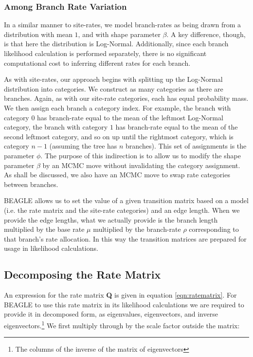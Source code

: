 \documentclass[10pt,journal,compsoc]{IEEEtran}
\begin{document}
\subsubsection{Among Branch Rate Variation}

In a similar manner to site-rates, we model branch-rates as being drawn from a distribution with mean $1$, and with shape parameter $\beta$. A key difference, though, is that here the distribution is Log-Normal. Additionally, since each branch likelihood calculation is performed separately, there is no significant computational cost to inferring different rates for each branch.

As with site-rates, our approach begins with splitting up the Log-Normal distribution into categories. We construct as many categories as there are branches. Again, as with our site-rate categories, each has equal probability mass. We then assign each branch a category index. For example, the branch with category $0$ has branch-rate equal to the mean of the leftmost Log-Normal category, the branch with category $1$ has branch-rate equal to the mean of the second leftmost category, and so on up until the rightmost category, which is category $n - 1$ (assuming the tree has $n$ branches). This set of assignments is the parameter $\phi$. The purpose of this indirection is to allow us to modify the shape parameter $\beta$ by an MCMC move without invalidating the category assignment. As shall be discussed, we also have an MCMC move to swap rate categories between branches.

BEAGLE allows us to set the value of a given transition matrix based on a model (i.e. the rate matrix and the site-rate categories) and an edge length. When we provide the edge lengths, what we actually provide is the branch length multiplied by the base rate $\mu$ multiplied by the branch-rate $\rho$ corresponding to that branch's rate allocation. In this way the transition matrices are prepared for usage in likelihood calculations.

\subsection{Decomposing the Rate Matrix}

An expression for the rate matrix \textbf{Q} is given in equation \eqref{eqn:ratematrix}. For BEAGLE to use this rate matrix in its likelihood calculations we are required to provide it in decomposed form, as eigenvalues, eigenvectors, and inverse eigenvectors.\footnote{The columns of the inverse of the matrix of eigenvectors} We first multiply through by the scale factor outside the matrix:
\end{document}
